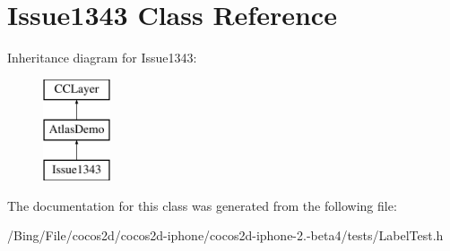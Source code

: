 \hypertarget{interface_issue1343}{\section{Issue1343 Class Reference}
\label{interface_issue1343}
}
Inheritance diagram for Issue1343\-:\begin{figure}[H]
\begin{center}
\leavevmode
\includegraphics[height=3.000000cm]{interface_issue1343}
\end{center}
\end{figure}


The documentation for this class was generated from the following file\-:\begin{DoxyCompactItemize}
\item 
/\-Bing/\-File/cocos2d/cocos2d-\/iphone/cocos2d-\/iphone-\/2.-\/beta4/tests/Label\-Test.\-h\end{DoxyCompactItemize}
